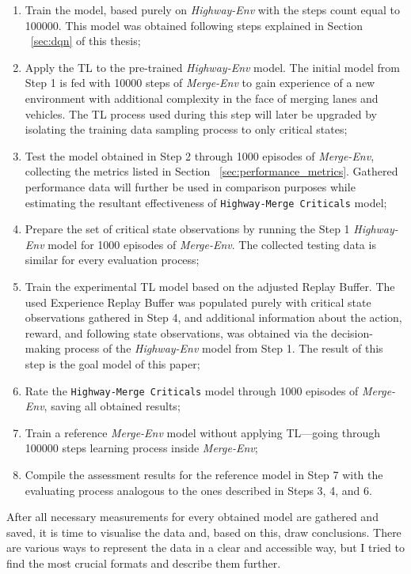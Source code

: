 \begin{enumerate}
    \item Train the model, based purely on \emph{Highway-Env} with the steps count equal to 100000. This model was obtained following steps explained in Section ~\ref{sec:dqn} of this thesis;
    \item Apply the TL to the pre-trained \emph{Highway-Env} model. The initial model from Step 1 is fed with 10000 steps of \emph{Merge-Env} to gain experience of a new environment with additional complexity in the face of merging lanes and vehicles. The TL process used during this step will later be upgraded by isolating the training data sampling process to only critical states;
    \item Test the model obtained in Step 2 through 1000 episodes of \emph{Merge-Env}, collecting the metrics listed in Section ~\ref{sec:performance_metrics}. Gathered performance data will further be used in comparison purposes while estimating the resultant effectiveness of \texttt{Highway-Merge Criticals} model;
    \item Prepare the set of critical state observations by running the Step 1 \emph{Highway-Env} model for 1000 episodes of \emph{Merge-Env}. The collected testing data is similar for every evaluation process;
    \item Train the experimental TL model based on the adjusted Replay Buffer. The used Experience Replay Buffer was populated purely with critical state observations gathered in Step 4, and additional information about the action, reward, and following state observations, was obtained via the decision-making process of the \emph{Highway-Env} model from Step 1. The result of this step is the goal model of this paper;
    \item Rate the \texttt{Highway-Merge Criticals} model through 1000 episodes of \emph{Merge-Env}, saving all obtained results;
    \item Train a reference \emph{Merge-Env} model without applying TL—going through 100000 steps learning process inside \emph{Merge-Env};
    \item Compile the assessment results for the reference model in Step 7 with the evaluating process analogous to the ones described in Steps 3, 4, and 6.
\end{enumerate}

After all necessary measurements for every obtained model are gathered and saved, it is time to visualise the data and, based on this, draw conclusions. There are various ways to represent the data in a clear and accessible way, but I tried to find the most crucial formats and describe them further. 

